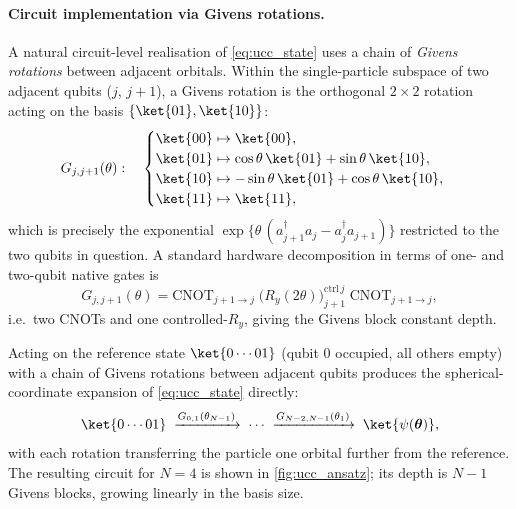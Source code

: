 \paragraph{Circuit implementation via Givens rotations.}
A natural circuit-level realisation of \cref{eq:ucc_state} uses a chain of
\emph{Givens rotations} between adjacent orbitals. Within the
single-particle subspace of two adjacent qubits ($j$, $j+1$), a Givens
rotation is the orthogonal $2\times 2$ rotation acting on the basis
$\{\ket{01},\ket{10}\}$:
\begin{equation}
  \label{eq:givens_def}
  G_{j,j+1}(\theta):\quad
  \begin{cases}
    \ket{00} \mapsto \ket{00},\\
    \ket{01} \mapsto \cos\theta\,\ket{01} + \sin\theta\,\ket{10},\\
    \ket{10} \mapsto -\sin\theta\,\ket{01} + \cos\theta\,\ket{10},\\
    \ket{11} \mapsto \ket{11},
  \end{cases}
\end{equation}
which is precisely the exponential
$\exp\bigl\{\theta\,(a_{j+1}^{\dagger}a_j - a_j^{\dagger}a_{j+1})\bigr\}$
restricted to the two qubits in question. A standard hardware decomposition
in terms of one- and two-qubit native gates is
\begin{equation}
  \label{eq:givens_decomp}
  G_{j,j+1}(\theta) =
    \mathrm{CNOT}_{j+1\to j}\;
    \bigl(R_y(2\theta)\bigr)_{j+1}^{\mathrm{ctrl}\,j}\;
    \mathrm{CNOT}_{j+1\to j},
\end{equation}
i.e.\ two CNOTs and one controlled-$R_y$, giving the Givens block constant
depth.

Acting on the reference state $\ket{0\cdots 01}$ (qubit $0$ occupied, all
others empty) with a chain of Givens rotations between adjacent qubits
produces the spherical-coordinate expansion of \cref{eq:ucc_state}
directly:
\begin{equation*}
  \ket{0\cdots 01}
  \;\xrightarrow{G_{0,1}(\theta_{N-1})}\;
  \cdots
  \;\xrightarrow{G_{N-2,N-1}(\theta_1)}\;
  \ket{\psi(\bm{\theta})},
\end{equation*}
with each rotation transferring the particle one orbital further from the
reference. The resulting circuit for $N=4$ is shown in
\cref{fig:ucc_ansatz}; its depth is $N-1$ Givens blocks, growing linearly
in the basis size.


